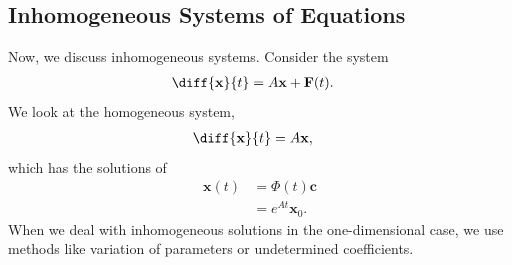 \documentclass[10pt]{mypackage}
\begin{document}
\subsection{Inhomogeneous Systems of Equations}%
Now, we discuss inhomogeneous systems. Consider the system
\begin{align*}
  \diff{\mathbf{x}}{t} &= A\mathbf{x} + \mathbf{F}(t).
\end{align*}
We look at the homogeneous system,
\begin{align*}
  \diff{\mathbf{x}}{t} &= A\mathbf{x},
\end{align*}
which has the solutions of
\begin{align*}
  \mathbf{x}(t) &= \Phi(t) \mathbf{c}\\
                &= e^{At}\mathbf{x}_0.
\end{align*}
When we deal with inhomogeneous solutions in the one-dimensional case, we use methods like variation of parameters or undetermined coefficients.\newline
\end{document}
